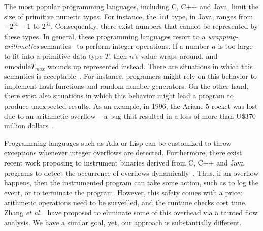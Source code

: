 \documentclass[preprint]{sigplanconf}[10pt]
\begin{document}
The most popular programming languages, including C, C++ and Java, limit the
size of primitive numeric types.
For instance, the \texttt{int} type, in Java, ranges from $-2^{31}-1$ to
$2^{31}$.
Consequently, there exist numbers that cannot be represented by these types.
In general, these programming languages resort to a {\em wrapping-arithmetics}
semantics~\cite{Warren02} to perform integer operations.
If a number $n$ is too large to fit into a primitive data type $T$, then $n$'s
value wraps around, and $n \mbox{module} T_{max}$ wounds up represented
instead.
There are situations in which this semantics is acceptable~\cite{Dietz12}.
For instance, programers might rely on this behavior to implement hash functions
and random number generators.
On the other hand, there exist also situations in which this behavior might
lead a program to produce unexpected results.
As an example, in 1996, the Ariane 5 rocket was lost due to an arithmetic
overflow -- a bug that resulted in a loss of more than U\$370 million
dollars~\cite{Dowson97}.

Programming languages such as Ada or Lisp can be customized to throw exceptions
whenever integer overflows are detected.
Furthermore, there exist recent work proposing to instrument binaries derived
from C, C++ and Java programs to detect the occurrence of overflows
dynamically~\cite{Brumley07,Dietz12}.
Thus, if an overflow happens, then the instrumented program can take some
action, such as to log the event, or to terminate the program.
However, this safety comes with a price: arithmetic operations need to be
surveilled, and the runtime checks cost time.
Zhang {\em et al.}~\cite{Zhang09} have proposed to eliminate some of this
overhead via a tainted flow analysis.
We have a similar goal, yet, our approach is substantially different.
\end{document}
